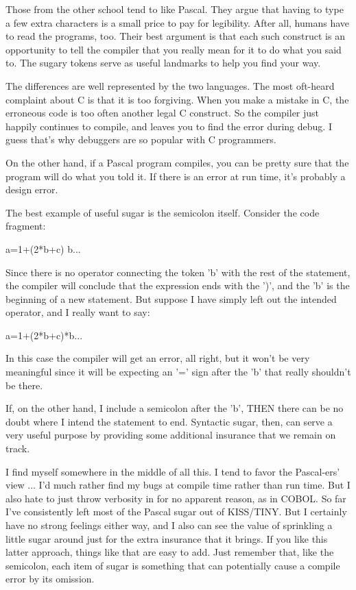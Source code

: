 \documentclass[float=false, crop=false]{standalone}
\begin{document}
Those from the other school tend to like Pascal. They argue that having to type
a few extra characters is a small price to pay for legibility. After all, humans
have to read the programs, too. Their best argument is that each such construct
is an opportunity to tell the compiler that you really mean for it to do what
you said to. The sugary tokens serve as useful landmarks to help you find your
way.

The differences are well represented by the two languages. The most oft-heard
complaint about C is that it is too forgiving. When you make a mistake in C, the
erroneous code is too often another legal C construct. So the compiler just
happily continues to compile, and leaves you to find the error during debug. I
guess that's why debuggers are so popular with C programmers.

On the other hand, if a Pascal program compiles, you can be pretty sure that the
program will do what you told it. If there is an error at run time, it's
probably a design error.

The best example of useful sugar is the semicolon itself. Consider the code
fragment:


     a=1+(2*b+c)   b...


Since there is no operator connecting the token 'b' with the rest of the
statement, the compiler will conclude that the expression ends with the ')', and
the 'b' is the beginning of a new statement. But suppose I have simply left out
the intended operator, and I really want to say:


     a=1+(2*b+c)*b...


In this case the compiler will get an error, all right, but it won't be very
meaningful since it will be expecting an '=' sign after the 'b' that really
shouldn't be there.

If, on the other hand, I include a semicolon after the 'b', THEN there can be no
doubt where I intend the statement to end. Syntactic sugar, then, can serve a
very useful purpose by providing some additional insurance that we remain on
track.

I find myself somewhere in the middle of all this. I tend to favor the
Pascal-ers' view ... I'd much rather find my bugs at compile time rather than
run time. But I also hate to just throw verbosity in for no apparent reason, as
in COBOL. So far I've consistently left most of the Pascal sugar out of
KISS/TINY. But I certainly have no strong feelings either way, and I also can
see the value of sprinkling a little sugar around just for the extra insurance
that it brings. If you like this latter approach, things like that are easy to
add. Just remember that, like the semicolon, each item of sugar is something
that can potentially cause a compile error by its omission.
\end{document}
